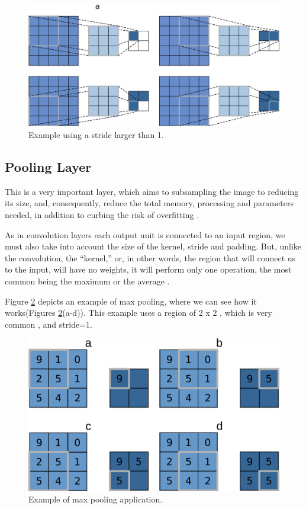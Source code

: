 \begin{figure}
    \centering
    \includegraphics[scale=0.20]{"Part 3 - Learning Systems/Supervised Learning/Deep Learning/images/stride.png"}
    \caption{Example using a stride larger than 1.}
    \label{fig:stride}
\end{figure}

\subsection{Pooling Layer}

This is a very important layer, which aims to subsampling the image to reducing its size, and, consequently, reduce the total memory, processing and parameters needed, in addition to curbing the risk of overfitting \cite{geron2019}\cite{adrian2017}\cite{elgendy2020}.

As in convolution layers each output unit is connected to an input region, we must also take into account the size of the kernel, stride and padding. But, unlike the convolution, the “kernel,” or, in other words, the region that will connect us to the input, will have no weights, it will perform only one operation, the most common being the maximum or the average \cite{geron2019} .

Figure \ref{fig:figure121} depicts an example of max pooling, where we can see how it works(Figures \ref{fig:figure121}(a-d)). This example uses a region of 2 x 2 , which is very common \cite{adrian2017}, and stride=1.

\begin{figure}
    \centering
    \includegraphics[scale=0.30]{"Part 3 - Learning Systems/Supervised Learning/Deep Learning/images/figure121.png"}
    \caption{Example of max pooling application.}
    \label{fig:figure121}
\end{figure}

